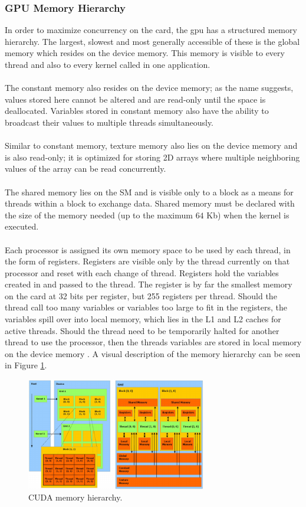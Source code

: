 \subsubsection{GPU Memory Hierarchy}\label{gpu:ssec:mem}
In order to maximize concurrency on the card, the \gls{gpu} has a structured memory hierarchy. The largest, slowest and most generally accessible of these is the global memory which resides on the device memory. This memory is visible to every thread and also to every kernel called in one application. 
\\
\\
The constant memory also resides on the device memory; as the name suggests, values stored here cannot be altered and are read-only until the space is deallocated. Variables stored in constant memory also have the ability to broadcast their values to multiple threads simultaneously.
\\
\\
Similar to constant memory, texture memory also lies on the device memory and is also read-only; it is optimized for storing 2D arrays where multiple neighboring values of the array can be read concurrently.
\\
\\
The shared memory lies on the SM and is visible only to a block as a means for threads within a block to exchange data. Shared memory must be declared with the size of the memory needed (up to the maximum $64$ Kb) when the kernel is executed.
\\
\\
Each processor is assigned its own memory space to be used by each thread, in the form of registers. Registers are visible only by the thread currently on that processor and reset with each change of thread. Registers hold the variables created in and passed to the thread. The register is by far the smallest memory on the card at 32 bits per register, but 255 registers per thread. Should the thread call too many variables or variables too large to fit in the registers, the variables spill over into local memory, which lies in the L1 and L2 caches for active threads. Should the thread need to be temporarily halted for another thread to use the processor, then the threads variables are stored in local memory on the device memory \citep{CUDA}. A visual description of the memory hierarchy can be seen in Figure \ref{gpu:img:mem}.
%
\begin{figure}[H]
\centering
 \includegraphics[width=0.7\textwidth]{Images/Cuda_mem_struct.png}
 \caption[]{CUDA memory hierarchy.\footnotemark}
 \label{gpu:img:mem}
\end{figure}
%
